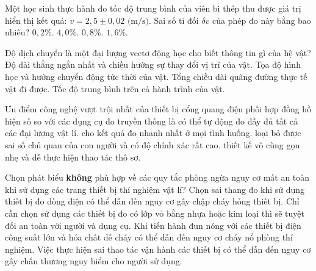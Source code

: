 \begin{ex}%
	Một học sinh thực hành đo tốc độ trung bình của viên bi thép thu được giá trị hiển thị kết quả: $v = 2,5 \pm 0,02\text{ (m/s)}$. Sai số tỉ đối $\delta v$ của phép đo này bằng bao nhiêu?
	\choice
	{$0,2\%$.}
	{$4,0\%$.}
	{\True $0,8\%$.}
	{$1,6\%$.}
\end{ex}

\begin{ex}%
	Độ dịch chuyển là một đại lượng vectơ động học cho biết thông tin gì của hệ vật?
	\choice
	{\True Độ dài thẳng ngắn nhất và chiều hướng sự thay đổi vị trí của vật.}
	{Tọa độ hình học và hướng chuyển động tức thời của vật.}
	{Tổng chiều dài quãng đường thực tế vật đi được.}
	{Tốc độ trung bình trên cả hành trình của vật.}
\end{ex}

\begin{ex}%
	Ưu điểm công nghệ vượt trội nhất của thiết bị cổng quang điện phối hợp đồng hồ hiện số so với các dụng cụ đo truyền thống là
	\choice
	{có thể tự động đo đầy đủ tất cả các đại lượng vật lí.}
	{cho kết quả đo nhanh nhất ở mọi tình huống.}
	{\True loại bỏ được sai số chủ quan của con người và có độ chính xác rất cao.}
	{thiết kế vô cùng gọn nhẹ và dễ thực hiện thao tác thô sơ.}
	\nobreak
\end{ex}

\begin{ex}%
	Chọn phát biểu \textbf{không} phù hợp về các quy tắc phòng ngừa nguy cơ mất an toàn khi sử dụng các trang thiết bị thí nghiệm vật lí?
	\choice
	{Chọn sai thang đo khi sử dụng thiết bị đo dòng điện có thể dẫn đến nguy cơ gây chập cháy hỏng thiết bị.}
	{\True Chỉ cần chọn sử dụng các thiết bị đo có lớp vỏ bằng nhựa hoặc kim loại thì sẽ tuyệt đối an toàn với người và dụng cụ.}
	{Khi tiến hành đun nóng với các thiết bị điện công suất lớn và hóa chất dễ cháy có thể dẫn đến nguy cơ cháy nổ phòng thí nghiệm.}
	{Việc thực hiện sai thao tác vận hành các thiết bị có thể dẫn đến nguy cơ gây chấn thương nguy hiểm cho người sử dụng.}
	\nobreak
\end{ex}


